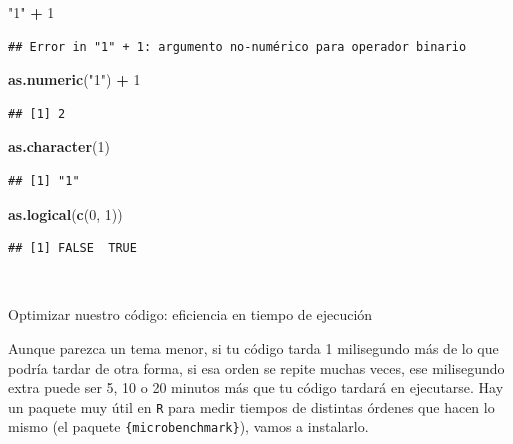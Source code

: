 \documentclass[11pt,]{book}
\newenvironment{Shaded}{\begin{snugshade}}{\end{snugshade}}
\newcommand{\DecValTok}[1]{\textcolor[rgb]{0.06,0.06,0.06}{#1}}
\newcommand{\KeywordTok}[1]{\textcolor[rgb]{0.27,0.27,0.27}{\textbf{#1}}}
\newcommand{\NormalTok}[1]{#1}
\newcommand{\OperatorTok}[1]{\textcolor[rgb]{0.43,0.43,0.43}{\textbf{#1}}}
\newcommand{\StringTok}[1]{\textcolor[rgb]{0.5,0.5,0.5}{#1}}
\begin{document}
\begin{Shaded}
\begin{Highlighting}[]
\StringTok{"1"} \OperatorTok{+}\StringTok{ }\DecValTok{1}
\end{Highlighting}
\end{Shaded}

\begin{verbatim}
## Error in "1" + 1: argumento no-numérico para operador binario
\end{verbatim}

\begin{Shaded}
\begin{Highlighting}[]
\KeywordTok{as.numeric}\NormalTok{(}\StringTok{"1"}\NormalTok{) }\OperatorTok{+}\StringTok{ }\DecValTok{1}
\end{Highlighting}
\end{Shaded}

\begin{verbatim}
## [1] 2
\end{verbatim}

\begin{Shaded}
\begin{Highlighting}[]
\KeywordTok{as.character}\NormalTok{(}\DecValTok{1}\NormalTok{)}
\end{Highlighting}
\end{Shaded}

\begin{verbatim}
## [1] "1"
\end{verbatim}

\begin{Shaded}
\begin{Highlighting}[]
\KeywordTok{as.logical}\NormalTok{(}\KeywordTok{c}\NormalTok{(}\DecValTok{0}\NormalTok{, }\DecValTok{1}\NormalTok{))}
\end{Highlighting}
\end{Shaded}

\begin{verbatim}
## [1] FALSE  TRUE
\end{verbatim}

~

Optimizar nuestro código: eficiencia en tiempo de ejecución

Aunque parezca un tema menor, si tu código tarda 1 milisegundo más de lo que podría tardar de otra forma, si esa orden se repite muchas veces, ese milisegundo extra puede ser 5, 10 o 20 minutos más que tu código tardará en ejecutarse. Hay un paquete muy útil en \texttt{R} para medir tiempos de distintas órdenes que hacen lo mismo (el paquete \texttt{\{microbenchmark\}}), vamos a instalarlo.
\end{document}
